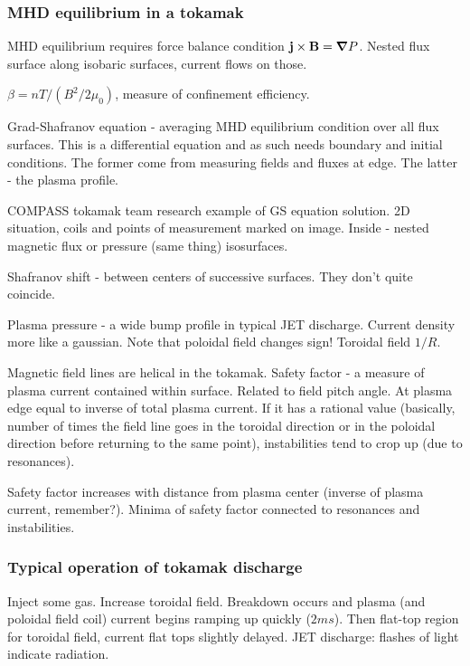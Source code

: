 \documentclass[PlasmaNotes.tex]{subfiles}
\begin{document}
  \subsubsection{MHD equilibrium in a tokamak}
  
    MHD equilibrium requires force balance condition $\mathbf{j} \times \mathbf{B} = \mbox{\boldmath$ \nabla $} P$. Nested flux surface along isobaric surfaces, current flows on those.
    
    $\beta = nT/(B^2/2\mu_0)$, measure of confinement efficiency.
    
    Grad-Shafranov equation - averaging MHD equilibrium condition over all flux surfaces. This is a differential equation and as such needs boundary and initial conditions. The former come from measuring fields and fluxes at edge. The latter - the plasma profile.
    
    COMPASS tokamak team research example of GS equation solution. 2D situation, coils and points of measurement marked on image. Inside - nested magnetic flux or pressure (same thing) isosurfaces.
    
    Shafranov shift - between centers of successive surfaces. They don't quite coincide.
    
    Plasma pressure - a wide bump profile in typical JET discharge. Current density more like a gaussian. Note that poloidal field changes sign! Toroidal field $1/R$.
    
    Magnetic field lines are helical in the tokamak. Safety factor - a measure of plasma current contained within surface. Related to field pitch angle. At plasma edge equal to inverse of total plasma current. If it has a rational value (basically, number of times the field line goes in the toroidal direction or in the poloidal direction before returning to the same point), instabilities tend to crop up (due to resonances). 
    
    Safety factor increases with distance from plasma center (inverse of plasma current, remember?). Minima of safety factor connected to resonances and instabilities.
    
  \subsubsection{Typical operation of tokamak discharge}
  
    Inject some gas. Increase toroidal field. Breakdown occurs and plasma (and poloidal field coil) current begins ramping up quickly ($2ms$). Then flat-top region for toroidal field, current flat tops slightly delayed. JET discharge: flashes of light indicate radiation.
   
\end{document}
